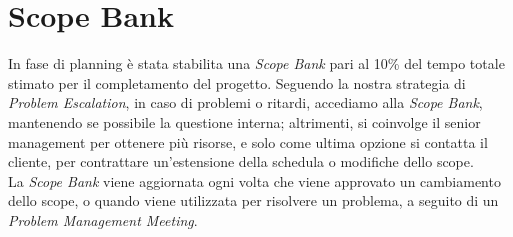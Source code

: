 \documentclass[a4paper,12pt]{article}
\begin{document}
\begin{table}[!htb]
    \centering
    \caption{Esempio di \textit{Issues Log}.}
    \label{tab:issues-log}
\end{table}

\section{Scope Bank}
In fase di planning è stata stabilita una \textit{Scope Bank} pari al 10\% del tempo totale stimato per il
completamento del progetto. Seguendo la nostra strategia di \textit{Problem Escalation}, in caso di problemi o ritardi,
accediamo alla \textit{Scope Bank}, mantenendo se possibile la questione interna; altrimenti, si coinvolge il senior
management per ottenere più risorse, e solo come ultima opzione si contatta il cliente, per contrattare un'estensione
della schedula o modifiche dello scope. \\
La \textit{Scope Bank} viene aggiornata ogni volta che viene approvato un cambiamento dello scope, o quando viene
utilizzata per risolvere un problema, a seguito di un \textit{Problem Management Meeting}.
\end{document}
